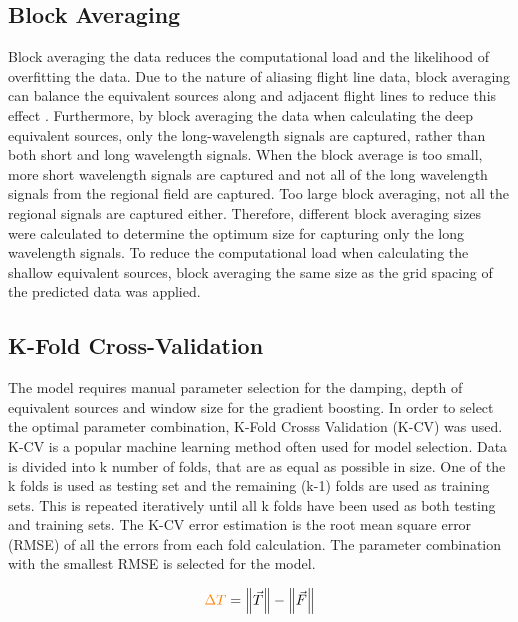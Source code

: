 \subsection{Block Averaging}
Block averaging the data reduces the computational load and the likelihood of overfitting the data. Due to the nature of aliasing flight line data, block averaging can balance the equivalent sources along and adjacent flight lines to reduce this effect \cite{SolerUieda2021}. Furthermore, by block averaging the data when calculating the deep equivalent sources, only the long-wavelength signals are captured, rather than both short and long wavelength signals. When the block average is too small, more short wavelength signals are captured and not all of the long wavelength signals from the regional field are captured. Too large block averaging, not all the regional signals are captured either. Therefore, different block averaging sizes were calculated to determine the optimum size for capturing only the long wavelength signals. To reduce the computational load when calculating the shallow equivalent sources, block averaging the same size as the grid spacing of the predicted data was applied.

\subsection{K-Fold Cross-Validation}
The model requires manual parameter selection for the damping, depth of equivalent sources and window size for the gradient boosting. In order to select the optimal parameter combination, K-Fold Crosss Validation (K-CV) was used. K-CV is a popular machine learning method often used for model selection. Data is divided into k number of folds, that are as equal as possible in size. One of the k folds is used as testing set and the remaining (k-1) folds are used as training sets. This is repeated iteratively until all k folds have been used as both testing and training sets. The K-CV error estimation is the root mean square error (RMSE) of all the errors from each fold calculation. The parameter combination with the smallest RMSE is selected for the model.



\begin{equation}
    \textcolor{orange}{\Delta T} = \left\lVert \vec{T} \right\rVert - \left\lVert \vec{F} \right\rVert
\end{equation}

